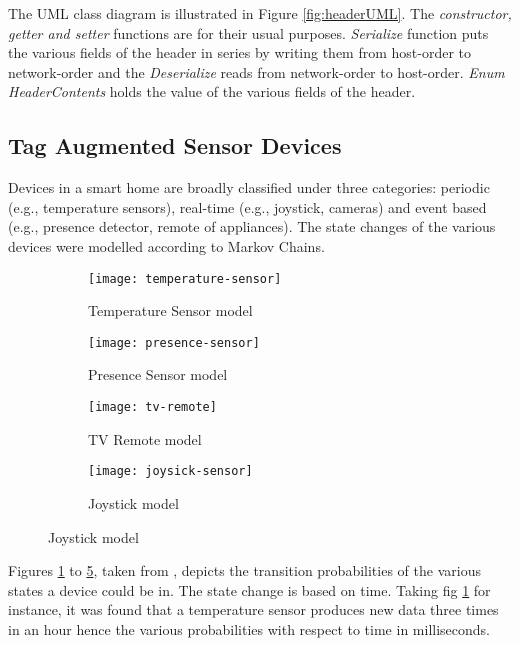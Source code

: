The UML class diagram is illustrated in Figure \ref{fig:headerUML}. The \emph{
constructor, getter and setter} functions are for their usual purposes. \emph{
Serialize} function puts the various fields of the header in series by writing them
from host-order to network-order and the \emph{Deserialize} reads from network-order
to host-order. \emph{Enum HeaderContents} holds the value of the various fields of
the header.

\subsection{Tag Augmented Sensor Devices}
Devices in a smart home are broadly classified under three categories: periodic
(e.g., temperature sensors), real-time (e.g., joystick, cameras) and event based 
(e.g., presence detector, remote of appliances)\cite{Maselli}. The state changes
of the various devices were modelled according to Markov Chains\cite{Tolver}.
\begin{figure}[h]
    \begin{subfigure}[b]{.5\textwidth}
        \centering
        \texttt{[image: temperature-sensor]}
        \caption{Temperature Sensor model}
        \label{fig:temperature-sensor}
    \end{subfigure}
    \begin{subfigure}[b]{.5\textwidth}
        \centering
        \texttt{[image: presence-sensor]}
        \caption{Presence Sensor model}
        \label{fig:presence-sensor}
    \end{subfigure}
    \begin{subfigure}[b]{.5\textwidth}
        \centering
        \texttt{[image: tv-remote]}
        \caption{TV Remote model}
        \label{fig:tv-remote}
    \end{subfigure}
    \begin{subfigure}[b]{.5\textwidth}
        \centering
        \texttt{[image: joysick-sensor]}
        \caption{Joystick model}
        \label{fig:joysick-sensor}
    \end{subfigure}
\end{figure}
Figures \ref{fig:temperature-sensor} to \ref{fig:joysick-sensor}, taken from
\cite{Maselli}, depicts the transition probabilities of the various states a device
could be in. The state change is based on time. Taking fig \ref{fig:temperature-sensor}
for instance, it was found that a temperature sensor produces new data three times in
an hour hence the various probabilities with respect to time in milliseconds.\\\\
